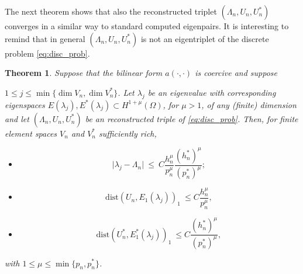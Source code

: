 \documentclass[preprint,12pt]{elsarticle}
\newtheorem{theorem}{Theorem}[section]
\begin{document}
The next theorem shows that also the reconstructed triplet $(\Lambda_n,U_n,U_n^*)$ converges in a similar way to standard computed eigenpairs. It is interesting to remind that in general $(\Lambda_n,U_n,U_n^*)$ is not an eigentriplet of the discrete problem \eqref{eq:disc_prob}.


\begin{theorem}
\label{th:adj_rec}
Suppose  that the bilinear form $a(\cdot,\cdot)$ is coercive and suppose

$ 1 \leq j\leq \min\{\dim V_n,\dim V_n^*\}$. 
Let
$\lambda_j$ be an eigenvalue with
corresponding eigenspaces $E(\lambda_j),E^*(\lambda_j)\subset H^{1+\mu}(\Omega)$, for $\mu>1$, of any (finite) dimension  and
let $(\Lambda_n,U_n,U_n^*)$ be an  reconstructed triple  of \eqref{eq:disc_prob}.
Then, for finite element spaces $V_n$ and $V_n^*$ sufficiently rich,


\begin{itemize}
\item[(i)] 
\begin{equation}\label{eq:supereig_rec}
\vert \lambda_j - \Lambda_n \vert \ \leq \ C
\frac{h_n^{\mu} }{p_n^{\mu}}\frac{(h_n^*)^{\mu} }{(p_n^*)^{\mu}};  
\end{equation}
\item[(ii)] 
\begin{equation}
\label{eq:energy_rec} \mathrm{dist}(
U_n,E_1(\lambda_j))_{1} \ \leq
C \frac{h_n^{\mu}}{p_n^{\mu}}, 
\end{equation}
\item[(iii)]
\begin{equation}
\label{eq:energy_dual_rec} \mathrm{dist}(
U_n^*,E_1^*(\lambda_j))_{1} \ \leq
C \frac{(h_n^*)^{\mu}}{(p_n^*)^{\mu}}, 
\end{equation}
\end{itemize}
with $1\leq \mu\leq \min\{p_n,p_n^*\}$.
\end{theorem}
\end{document}
